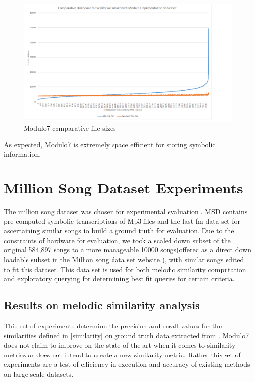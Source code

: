 \begin{figure}
\centering
\includegraphics[width=\textwidth]{M7Graph.png}
\makeatletter
\let\@currsize\normalsize
\caption{Modulo7 comparative file sizes}
\label{fig:filesizes}
\end{figure}

\noindent As expected, Modulo7 is extremely space efficient for storing symbolic information.
\section{Million Song Dataset Experiments}

\noindent The million song dataset was chosen for experimental evaluation \cite{msd}. MSD contains pre-computed symbolic transcriptions of Mp3 files and the last fm data set for ascertaining similar songs to build a ground truth for evaluation. Due to the constraints of hardware for evaluation, we took a scaled down subset of the original 584,897 songs to a more manageable 10000 songs(offered as a direct down loadable subset in the Million song data set website \cite{msddownloadable}), with similar songs edited to fit this dataset. This data set is used for both melodic similarity computation and exploratory querying for determining best fit queries for certain criteria.

\subsection{Results on melodic similarity analysis}

\noindent This set of experiments determine the precision and recall values for the similarities defined in \ref{similarity} on ground truth data extracted from \cite{msd}. Modulo7 does not claim to improve on the state of the art when it comes to similarity metrics or does not intend to create a new similarity metric. Rather this set of experiments are a test of efficiency in execution and accuracy of existing methods on large scale datasets. \\

